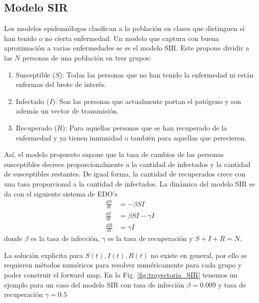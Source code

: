 \subsection{Modelo SIR}

Los modelos epidemiólogos clasifican a la población en clases que distinguen si han tenido o no cierta enfermedad. Un modelo que captura con buena aproximación a varias enfermedades se es el modelo SIR. Este propone dividir a las $N$ personas de una población en tres grupos:
\begin{enumerate}
    \item Susceptible ($S$): Todas las personas que no han tenido la enfermedad ni están enfermas del brote de interés.
    \item Infectado ($I$): Son las personas que actualmente portan el patógeno y son además un vector de transmisión.
    \item Recuperado ($R$): Para aquellas personas que se han recuperado de la enfermedad y ya tienen inmunidad o también para aquellas que perecieron.
\end{enumerate}

Así, el modelo propuesto supone que la tasa de cambios de las personas susceptibles decrece proporcionalmente a la cantidad de infectados y la cantidad de susceptibles restantes. De igual forma, la cantidad de recuperados crece con una tasa proporcional a la cantidad de infectados. La dinámica del modelo SIR se da con el siguiente sistema de EDO's
\begin{align}
    \frac{dS}{dt} &= -\beta S I \nonumber \\
    \frac{dI}{dt} &= \beta S I - \gamma I\\
    \frac{dR}{dt} &= \gamma I \nonumber
\end{align}
donde $\beta$ es la tasa de infección, $\gamma$ es la tasa de recuperación y $S + I + R = N$.

La solución explicita para $S(t), I(t), R(t)$ no existe en general, por ello se requieren métodos numéricos para resolver numéricamente para cada grupo y poder construir el forward map. En la Fig. \ref{fig:trayectoria_SIR} tenemos un ejemplo para un caso del modelo SIR con tasa de infección $\beta = 0.009$ y tasa de recuperación $\gamma = 0.5$


